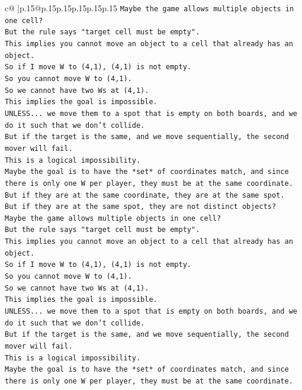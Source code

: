 \documentclass{article}
\begin{document}
{\begin{supertabular}{c@{$\;$}|p{.15\linewidth}@{}p{.15\linewidth}p{.15\linewidth}p{.15\linewidth}p{.15\linewidth}p{.15\linewidth}}
{{{\texttt{Maybe the game allows multiple objects in one cell?} \\
\texttt{But the rule says "target cell must be empty".} \\
\texttt{This implies you cannot move an object to a cell that already has an object.} \\
\texttt{So if I move W to (4,1), (4,1) is not empty.} \\
\texttt{So you cannot move W to (4,1).} \\
\texttt{So we cannot have two Ws at (4,1).} \\
\texttt{This implies the goal is impossible.} \\
\texttt{UNLESS... we move them to a spot that is empty on both boards, and we do it such that we don't collide.} \\
\texttt{But if the target is the same, and we move sequentially, the second mover will fail.} \\
\texttt{This is a logical impossibility.} \\
\texttt{Maybe the goal is to have the *set* of coordinates match, and since there is only one W per player, they must be at the same coordinate.} \\
\texttt{But if they are at the same coordinate, they are at the same spot.} \\
\texttt{But if they are at the same spot, they are not distinct objects?} \\
\texttt{Maybe the game allows multiple objects in one cell?} \\
\texttt{But the rule says "target cell must be empty".} \\
\texttt{This implies you cannot move an object to a cell that already has an object.} \\
\texttt{So if I move W to (4,1), (4,1) is not empty.} \\
\texttt{So you cannot move W to (4,1).} \\
\texttt{So we cannot have two Ws at (4,1).} \\
\texttt{This implies the goal is impossible.} \\
\texttt{UNLESS... we move them to a spot that is empty on both boards, and we do it such that we don't collide.} \\
\texttt{But if the target is the same, and we move sequentially, the second mover will fail.} \\
\texttt{This is a logical impossibility.} \\
\texttt{Maybe the goal is to have the *set* of coordinates match, and since there is only one W per player, they must be at the same coordinate.} \\
}}}
\end{supertabular}}
\end{document}
